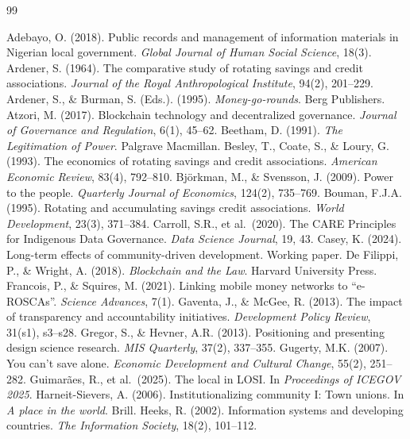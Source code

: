 \documentclass[sigconf,anonymous]{acmart}
\begin{document}
\begin{thebibliography}{99}

 Adebayo, O. (2018). Public records and management of information materials in Nigerian local government. \textit{Global Journal of Human Social Science}, 18(3).
 Ardener, S. (1964). The comparative study of rotating savings and credit associations. \textit{Journal of the Royal Anthropological Institute}, 94(2), 201--229.
 Ardener, S., \& Burman, S. (Eds.). (1995). \textit{Money-go-rounds}. Berg Publishers.
 Atzori, M. (2017). Blockchain technology and decentralized governance. \textit{Journal of Governance and Regulation}, 6(1), 45--62.
 Beetham, D. (1991). \textit{The Legitimation of Power}. Palgrave Macmillan.
 Besley, T., Coate, S., \& Loury, G. (1993). The economics of rotating savings and credit associations. \textit{American Economic Review}, 83(4), 792--810.
 Bj\"{o}rkman, M., \& Svensson, J. (2009). Power to the people. \textit{Quarterly Journal of Economics}, 124(2), 735--769.
 Bouman, F.J.A. (1995). Rotating and accumulating savings credit associations. \textit{World Development}, 23(3), 371--384.
 Carroll, S.R., et al.\ (2020). The CARE Principles for Indigenous Data Governance. \textit{Data Science Journal}, 19, 43.
 Casey, K. (2024). Long-term effects of community-driven development. Working paper.
 De Filippi, P., \& Wright, A. (2018). \textit{Blockchain and the Law}. Harvard University Press.
 Francois, P., \& Squires, M. (2021). Linking mobile money networks to ``e-ROSCAs''. \textit{Science Advances}, 7(1).
 Gaventa, J., \& McGee, R. (2013). The impact of transparency and accountability initiatives. \textit{Development Policy Review}, 31(s1), s3--s28.
 Gregor, S., \& Hevner, A.R. (2013). Positioning and presenting design science research. \textit{MIS Quarterly}, 37(2), 337--355.
 Gugerty, M.K. (2007). You can't save alone. \textit{Economic Development and Cultural Change}, 55(2), 251--282.
 Guimar\~{a}es, R., et al.\ (2025). The local in LOSI. In \textit{Proceedings of ICEGOV 2025}.
 Harneit-Sievers, A. (2006). Institutionalizing community I: Town unions. In \textit{A place in the world}. Brill.
 Heeks, R. (2002). Information systems and developing countries. \textit{The Information Society}, 18(2), 101--112.

\end{thebibliography}
\end{document}
